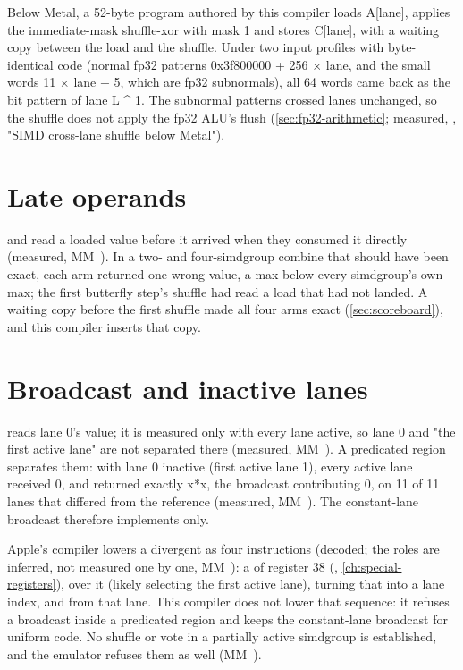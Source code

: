 Below Metal, a 52-byte program authored by this compiler loads A{[}lane{]}, applies the immediate-mask shuffle-xor with mask 1 and stores C{[}lane{]},
with a waiting copy between the load and the shuffle. Under two input profiles with byte-identical code (normal fp32 patterns 0x3f800000 + 256 $\times$ lane,
and the small words 11 $\times$ lane + 5, which are fp32 subnormals), all 64 words came back as the bit pattern of lane L \^{} 1.
The subnormal patterns crossed lanes unchanged, so the shuffle does not apply the fp32 ALU's flush (\cref{sec:fp32-arithmetic};
measured, , "SIMD cross-lane shuffle below Metal").

\section{Late operands}\label{sec:cross-lane-operations-consumers}

 and  read a loaded value before it arrived when they consumed it directly (measured, MM~).
In a two- and four-simdgroup combine that should have been exact, each arm returned one wrong value, a max below every
simdgroup's own max; the first butterfly step's shuffle had read a load that had not landed. A waiting copy before the
first shuffle made all four arms exact (\cref{sec:scoreboard}), and this compiler inserts that copy.

\section{Broadcast and inactive lanes}\label{sec:broadcast-inactive-lanes}

 reads lane 0's value; it is measured only with every lane active, so lane 0
and "the first active lane" are not separated there (measured, MM~). A predicated region separates them: with lane 0 inactive
(first active lane 1), every active lane received 0, and  returned exactly x*x, the broadcast
contributing 0, on 11 of 11 lanes that differed from the reference (measured, MM~). The constant-lane broadcast
therefore implements  only.

Apple's compiler lowers a divergent  as four instructions (decoded; the roles are inferred, not measured
one by one, MM~): a  of register 38 (, \cref{ch:special-registers}),  over it (likely selecting the first active lane),  turning
that into a lane index, and  from that lane. This compiler does not lower that
sequence: it refuses a broadcast inside a predicated region and keeps the constant-lane broadcast for uniform code. No shuffle or vote in a partially active simdgroup is
established, and the emulator refuses them as well (MM~).

